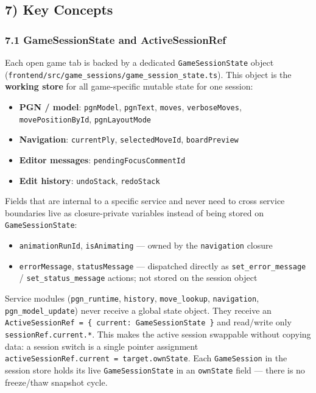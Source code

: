 \documentclass[]{article}
\providecommand{\tightlist}{%
  \setlength{\itemsep}{0pt}\setlength{\parskip}{0pt}}
\begin{document}
\subsection{7) Key Concepts}\label{key-concepts}

\subsubsection{7.1 GameSessionState and
ActiveSessionRef}\label{gamesessionstate-and-activesessionref}

Each open game tab is backed by a dedicated \texttt{GameSessionState}
object (\texttt{frontend/src/game\_sessions/game\_session\_state.ts}).
This object is the \textbf{working store} for all game-specific mutable
state for one session:

\begin{itemize}
\tightlist
\item
  \textbf{PGN / model}: \texttt{pgnModel}, \texttt{pgnText},
  \texttt{moves}, \texttt{verboseMoves}, \texttt{movePositionById},
  \texttt{pgnLayoutMode}
\item
  \textbf{Navigation}: \texttt{currentPly}, \texttt{selectedMoveId},
  \texttt{boardPreview}
\item
  \textbf{Editor messages}: \texttt{pendingFocusCommentId}
\item
  \textbf{Edit history}: \texttt{undoStack}, \texttt{redoStack}
\end{itemize}

Fields that are internal to a specific service and never need to cross
service boundaries live as closure-private variables instead of being
stored on \texttt{GameSessionState}:

\begin{itemize}
\tightlist
\item
  \texttt{animationRunId}, \texttt{isAnimating} --- owned by the
  \texttt{navigation} closure
\item
  \texttt{errorMessage}, \texttt{statusMessage} --- dispatched directly
  as \texttt{set\_error\_message} / \texttt{set\_status\_message}
  actions; not stored on the session object
\end{itemize}

Service modules (\texttt{pgn\_runtime}, \texttt{history},
\texttt{move\_lookup}, \texttt{navigation}, \texttt{pgn\_model\_update})
never receive a global state object. They receive an
\texttt{ActiveSessionRef\ =\ \{\ current:\ GameSessionState\ \}} and
read/write only \texttt{sessionRef.current.*}. This makes the active
session swappable without copying data: a session switch is a single
pointer assignment
\texttt{activeSessionRef.current\ =\ target.ownState}. Each
\texttt{GameSession} in the session store holds its live
\texttt{GameSessionState} in an \texttt{ownState} field --- there is no
freeze/thaw snapshot cycle.
\end{document}
